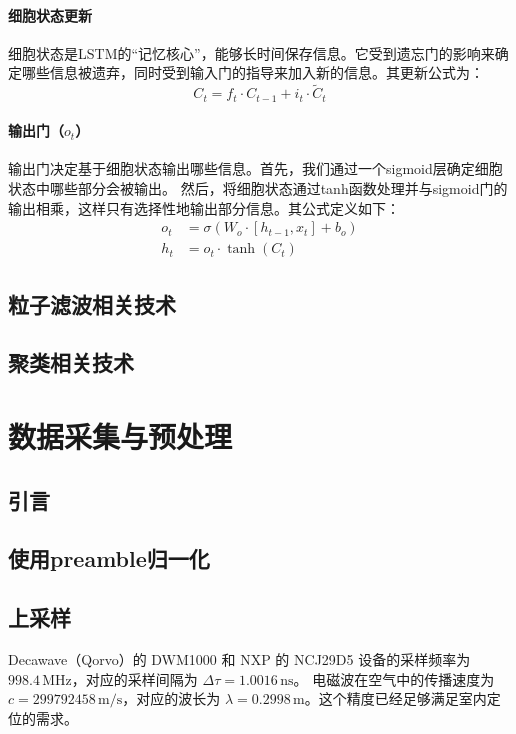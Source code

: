 \subsubsection{细胞状态更新}
细胞状态是LSTM的“记忆核心”，能够长时间保存信息。它受到遗忘门的影响来确定哪些信息被遗弃，同时受到输入门的指导来加入新的信息。其更新公式为：
\begin{equation}
C_t = f_t \cdot C_{t-1} + i_t \cdot \tilde{C}_t
\end{equation}

\subsubsection{输出门（\(o_t\)）}
输出门决定基于细胞状态输出哪些信息。首先，我们通过一个sigmoid层确定细胞状态中哪些部分会被输出。
然后，将细胞状态通过tanh函数处理并与sigmoid门的输出相乘，这样只有选择性地输出部分信息。其公式定义如下：
\begin{align}
o_t &= \sigma(W_o \cdot [h_{t-1}, x_t] + b_o) \\
h_t &= o_t \cdot \tanh(C_t)
\end{align}

\section{粒子滤波相关技术}

\section{聚类相关技术}

\chapter{数据采集与预处理}
\section{引言}
\section{使用preamble归一化}
\section{上采样}
Decawave（Qorvo）的 DWM1000 和 NXP 的 NCJ29D5 设备的采样频率为 \(998.4 \, \text{MHz}\)，对应的采样间隔为 \( \Delta \tau = 1.0016 \, \text{ns}\)。
电磁波在空气中的传播速度为 \(c = 299792458 \, \text{m/s}\)，对应的波长为 \(\lambda = 0.2998 \, \text{m}\)。这个精度已经足够满足室内定位的需求。

